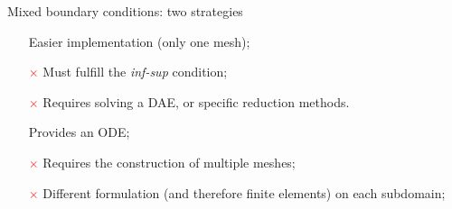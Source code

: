 \documentclass[aspectratio=169]{ISAE-Beamer}
\begin{document}
\begin{frame}{Mixed boundary conditions: two strategies}
	
	\begin{tcbraster}[raster columns=2, raster equal height]
		\begin{tcolorbox}[width=0.4\textwidth, nobeforeafter, colframe=theme,title=Lagrange multiplier]%
			\begin{itemize}
				\item[\textcolor{green}{\checkmark}] Easier implementation (only one mesh);
				\item[\textcolor{red}{$\times$}] Must fulfill the \textit{inf-sup} condition;	
				\item[\textcolor{red}{$\times$}] Requires solving a DAE, or specific reduction methods.
			\end{itemize}
		\end{tcolorbox} 
		\begin{tcolorbox}[width=0.4\textwidth, nobeforeafter,  colframe=theme,title=Virtual domain decomposition]%
			\begin{itemize}
				\item[\textcolor{green}{\checkmark}] Provides an ODE;
				\item[\textcolor{red}{$\times$}] Requires the construction of multiple meshes;
				\item[\textcolor{red}{$\times$}] Different formulation (and therefore finite elements) on each subdomain;
			\end{itemize}
		\end{tcolorbox}
	\end{tcbraster}
\end{frame}
\end{document}
